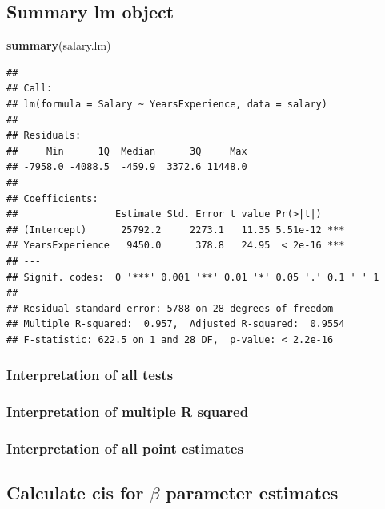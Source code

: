 \documentclass[]{article}
\newenvironment{Shaded}{\begin{snugshade}}{\end{snugshade}}
\newcommand{\KeywordTok}[1]{\textcolor[rgb]{0.13,0.29,0.53}{\textbf{#1}}}
\newcommand{\NormalTok}[1]{#1}
\begin{document}
\hypertarget{summary-lm-object}{%
\subsection{Summary lm object}\label{summary-lm-object}}

\begin{Shaded}
\begin{Highlighting}[]
\KeywordTok{summary}\NormalTok{(salary.lm)}
\end{Highlighting}
\end{Shaded}

\begin{verbatim}
## 
## Call:
## lm(formula = Salary ~ YearsExperience, data = salary)
## 
## Residuals:
##     Min      1Q  Median      3Q     Max 
## -7958.0 -4088.5  -459.9  3372.6 11448.0 
## 
## Coefficients:
##                 Estimate Std. Error t value Pr(>|t|)    
## (Intercept)      25792.2     2273.1   11.35 5.51e-12 ***
## YearsExperience   9450.0      378.8   24.95  < 2e-16 ***
## ---
## Signif. codes:  0 '***' 0.001 '**' 0.01 '*' 0.05 '.' 0.1 ' ' 1
## 
## Residual standard error: 5788 on 28 degrees of freedom
## Multiple R-squared:  0.957,  Adjusted R-squared:  0.9554 
## F-statistic: 622.5 on 1 and 28 DF,  p-value: < 2.2e-16
\end{verbatim}

\hypertarget{interpretation-of-all-tests}{%
\subsubsection{Interpretation of all
tests}\label{interpretation-of-all-tests}}

\hypertarget{interpretation-of-multiple-r-squared}{%
\subsubsection{Interpretation of multiple R
squared}\label{interpretation-of-multiple-r-squared}}

\hypertarget{interpretation-of-all-point-estimates}{%
\subsubsection{Interpretation of all point
estimates}\label{interpretation-of-all-point-estimates}}

\hypertarget{calculate-cis-for-beta-parameter-estimates}{%
\subsection{\texorpdfstring{Calculate cis for \(\beta\) parameter
estimates}{Calculate cis for \textbackslash beta parameter estimates}}\label{calculate-cis-for-beta-parameter-estimates}}
\end{document}
